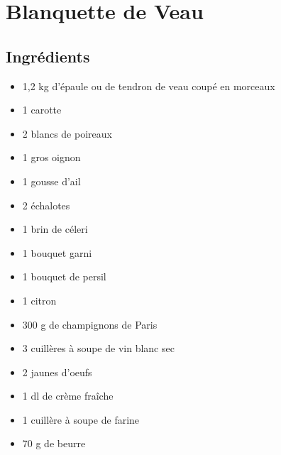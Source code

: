 \newpage
\section{Blanquette de Veau}
\subsection*{Ingrédients}
\begin{itemize}
\item 1,2 kg d'épaule ou de tendron de veau coupé en morceaux
\item 1 carotte
\item 2 blancs de poireaux
\item 1 gros oignon
\item 1 gousse d'ail
\item 2 échalotes
\item 1 brin de céleri
\item 1 bouquet garni
\item 1 bouquet de persil
\item 1 citron
\item 300 g de champignons de Paris
\item 3 cuillères à soupe de vin blanc sec
\item 2 jaunes d'oeufs
\item 1 dl de crème fraîche
\item 1 cuillère à soupe de farine
\item 70 g de beurre
\end{itemize}

